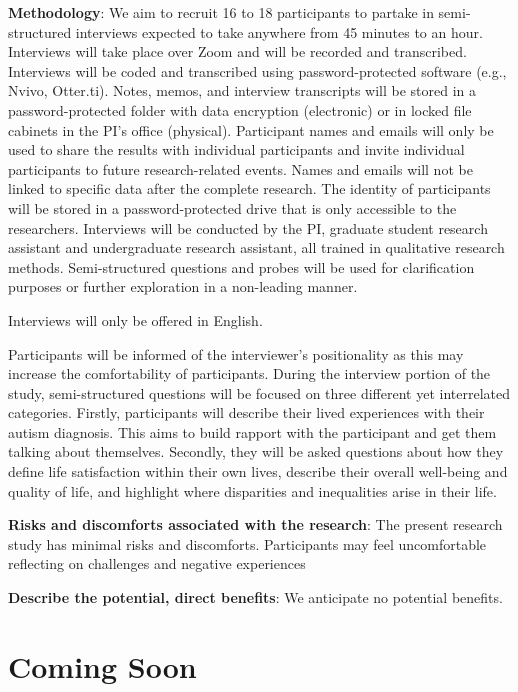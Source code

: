 \documentclass[
  11pt,
]{book}
\begin{document}
\textbf{Methodology}: We aim to recruit 16 to 18 participants to partake in semi-structured interviews expected to take anywhere from 45 minutes to an hour. Interviews will take place over Zoom and will be recorded and transcribed. Interviews will be coded and transcribed using password-protected software (e.g., Nvivo, Otter.ti). Notes, memos, and interview transcripts will be stored in a password-protected folder with data encryption (electronic) or in locked file cabinets in the PI's office (physical). Participant names and emails will only be used to share the results with individual participants and invite individual participants to future research-related events. Names and emails will not be linked to specific data after the complete research. The identity of participants will be stored in a password-protected drive that is only accessible to the researchers. Interviews will be conducted by the PI, graduate student research assistant and undergraduate research assistant, all trained in qualitative research methods. Semi-structured questions and probes will be used for clarification purposes or further exploration in a non-leading manner.

Interviews will only be offered in English.

Participants will be informed of the interviewer's positionality as this may increase the comfortability of participants. During the interview portion of the study, semi-structured questions will be focused on three different yet interrelated categories. Firstly, participants will describe their lived experiences with their autism diagnosis. This aims to build rapport with the participant and get them talking about themselves. Secondly, they will be asked questions about how they define life satisfaction within their own lives, describe their overall well-being and quality of life, and highlight where disparities and inequalities arise in their life.

\textbf{Risks and discomforts associated with the research}: The present research study has minimal risks and discomforts. Participants may feel uncomfortable reflecting on challenges and negative experiences

\textbf{Describe the potential, direct benefits}: We anticipate no potential benefits.

\chapter{Coming Soon}\label{coming-soon}
\end{document}

